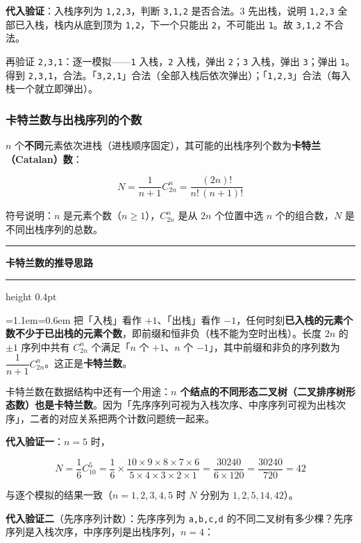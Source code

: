 \documentclass[11pt,openany,UTF8]{ctexbook}
\newcommand{\callouthead}[2]{%
  \par\addvspace{7pt}\noindent
  {\color{#1}\rule[-0.15em]{3pt}{1.05em}}\hspace{0.5em}%
  {\bfseries\color{#1}#2}\par\nobreak\vspace{-0.35em}%
  {\color{rulesep}\hrule height 0.4pt}\nobreak\vspace{0.45em}%
  \begingroup\small\setlength{\parindent}{0pt}%
  \leftskip=1.1em\rightskip=0.6em\noindent\ignorespaces}
\newcommand{\calloutend}{\par\endgroup\addvspace{7pt}}
\newenvironment{callkey}[1]{\callouthead{keybar}{#1}}{\calloutend}
\begin{document}
\textbf{代入验证}：入栈序列为 \texttt{1,\allowbreak{}2,\allowbreak{}3}，判断 \texttt{3,\allowbreak{}1,\allowbreak{}2} 是否合法。$3$ 先出栈，说明 \texttt{1,\allowbreak{}2,\allowbreak{}3} 全部已入栈，栈内从底到顶为 \texttt{1,\allowbreak{}2}，下一个只能出 \texttt{2}，不可能出 \texttt{1}。故 \texttt{3,\allowbreak{}1,\allowbreak{}2} 不合法。

再验证 \texttt{2,\allowbreak{}3,\allowbreak{}1}：逐一模拟——\texttt{1} 入栈，\texttt{2} 入栈，弹出 \texttt{2}；\texttt{3} 入栈，弹出 \texttt{3}；弹出 \texttt{1}。得到 \texttt{2,\allowbreak{}3,\allowbreak{}1}，合法。「\texttt{3,\allowbreak{}2,\allowbreak{}1}」合法（全部入栈后依次弹出）；「\texttt{1,\allowbreak{}2,\allowbreak{}3}」合法（每入栈一个就立即弹出）。

\subsubsection{卡特兰数与出栈序列的个数}

$n$ 个\textbf{不同}元素依次进栈（进栈顺序固定），其可能的出栈序列个数为\textbf{卡特兰（Catalan）数}：

\[N = \frac{1}{n+1}C_{2n}^{n} = \frac{(2n)!}{n!\,(n+1)!}\]

符号说明：$n$ 是元素个数（$n \ge 1$），$C_{2n}^{n}$ 是从 $2n$ 个位置中选 $n$ 个的组合数，$N$ 是不同出栈序列的总数。

\begin{callkey}{卡特兰数的推导思路}
把「入栈」看作 $+1$、「出栈」看作 $-1$，任何时刻\textbf{已入栈的元素个数不少于已出栈的元素个数}，即前缀和恒非负（栈不能为空时出栈）。长度 $2n$ 的 $\pm1$ 序列中共有 $C_{2n}^{n}$ 个满足「$n$ 个 $+1$、$n$ 个 $-1$」，其中前缀和非负的序列数为 $\dfrac{1}{n+1}C_{2n}^{n}$。这正是\textbf{卡特兰数}。

卡特兰数在数据结构中还有一个用途：\textbf{$n$ 个结点的不同形态二叉树（二叉排序树形态数）也是卡特兰数}。因为「先序序列可视为入栈次序、中序序列可视为出栈次序」，二者的对应关系把两个计数问题统一起来。

\end{callkey}

\textbf{代入验证一}：$n = 5$ 时，

\[N = \frac{1}{6}C_{10}^{5} = \frac{1}{6} \times \frac{10 \times 9 \times 8 \times 7 \times 6}{5 \times 4 \times 3 \times 2 \times 1} = \frac{30240}{6 \times 120} = \frac{30240}{720} = 42\]

与逐个模拟的结果一致（$n=1,2,3,4,5$ 时 $N$ 分别为 $1,2,5,14,42$）。

\textbf{代入验证二}（先序序列计数）：先序序列为 \texttt{a,\allowbreak{}b,\allowbreak{}c,\allowbreak{}d} 的不同二叉树有多少棵？先序序列是入栈次序，中序序列是出栈序列，$n = 4$：
\end{document}
